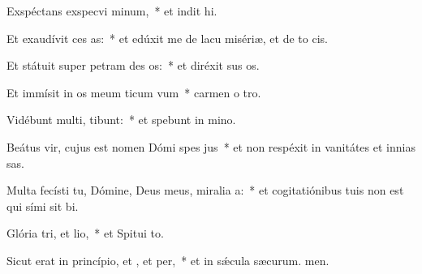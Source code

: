 \item Exspéctans exspecvi minum,~* et indit hi.
\item Et exaudívit ces as:~* et edúxit me de lacu misériæ, et de to cis.
\item Et státuit super petram des os:~* et diréxit sus os.
\item Et immísit in os meum ticum vum~* carmen o tro.
\item Vidébunt multi,  tibunt:~* et spebunt in mino.
\item Beátus vir, cujus est nomen Dómi spes jus~* et non respéxit in vanitátes et innias sas.
\item Multa fecísti tu, Dómine, Deus meus, miralia a:~* et cogitatiónibus tuis non est qui sími sit bi.
\item Glória tri, et lio,~* et Spitui to.
\item Sicut erat in princípio, et , et per,~* et in sǽcula sæcurum. men.
